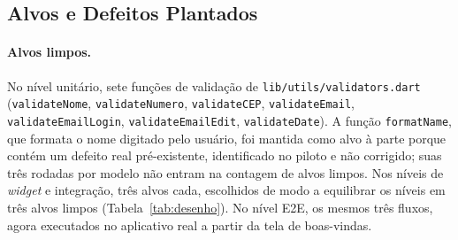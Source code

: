 \documentclass[12pt]{article}
\begin{document}
\subsection{Alvos e Defeitos Plantados}
\label{subsec:alvos}

\paragraph{Alvos limpos.} No nível unitário, sete funções de validação de
\texttt{lib/utils/validators.dart} (\texttt{validateNome},
\texttt{validateNumero}, \texttt{validateCEP}, \texttt{validateEmail},
\texttt{validateEmailLogin}, \texttt{validateEmailEdit},
\texttt{validateDate}). A função \texttt{formatName}, que formata o nome
digitado pelo usuário, foi mantida como alvo à
parte porque contém um defeito real pré-existente, identificado no piloto e
não corrigido; suas três rodadas por modelo não entram na contagem de alvos
limpos. Nos níveis de \textit{widget} e integração, três alvos cada,
escolhidos de modo a equilibrar os níveis em três alvos limpos
(Tabela~\ref{tab:desenho}). No nível E2E, os mesmos três fluxos, agora
executados no aplicativo real a partir da tela de boas-vindas.
\end{document}
